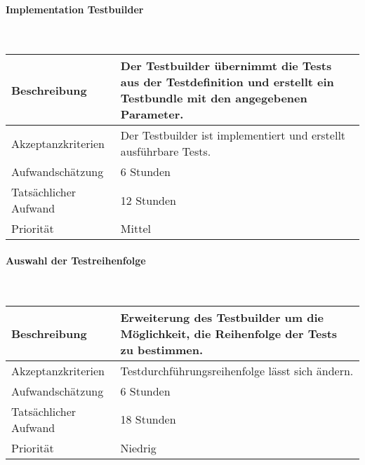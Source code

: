 \documentclass[]{subfiles}
\begin{document}
        \paragraph*{Implementation Testbuilder}\mbox{} \\
        \begin{tabularx}{\textwidth}{lX}
            \toprule
            Beschreibung & Der Testbuilder übernimmt die Tests aus der Testdefinition und erstellt ein Testbundle mit den angegebenen Parameter. \\
            \midrule
            Akzeptanzkriterien & Der Testbuilder ist implementiert und erstellt ausführbare Tests.\\
            \midrule
            Aufwandschätzung & 6 Stunden\\
            Tatsächlicher Aufwand & 12 Stunden\\
            \midrule
            Priorität & Mittel\\
            \bottomrule
        \end{tabularx}
    
        \paragraph*{Auswahl der Testreihenfolge}\mbox{} \\
        \begin{tabularx}{\textwidth}{lX}
            \toprule
            Beschreibung & Erweiterung des Testbuilder um die Möglichkeit, die Reihenfolge der Tests zu bestimmen.\\
            \midrule
            Akzeptanzkriterien & Testdurchführungsreihenfolge lässt sich ändern.\\
            \midrule
            Aufwandschätzung & 6 Stunden\\
            Tatsächlicher Aufwand & 18 Stunden \\
            \midrule
            Priorität & Niedrig\\
            \bottomrule
        \end{tabularx}
    
\end{document}
